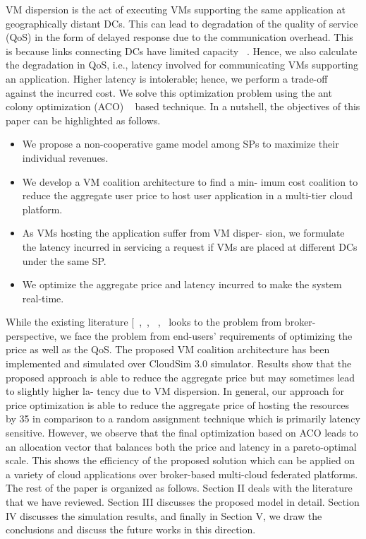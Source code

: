 \documentclass[12pt,a4paper,twoside,openright]{report}
\newcommand\tab[1][0.8cm]{\hspace*{#1}}
\begin{document}
\newline
\tab VM dispersion is the act of executing VMs supporting the
same application at geographically distant DCs. This can lead
to degradation of the quality of service (QoS) in the form of
delayed response due to the communication overhead. This
is because links connecting DCs have limited capacity ~\cite{b5}.
Hence, we also calculate the degradation in QoS, i.e., latency
involved for communicating VMs supporting an application.
Higher latency is intolerable; hence, we perform a trade-off
against the incurred cost. We solve this optimization problem
using the ant colony optimization (ACO) ~\cite{b6} based technique.
In a nutshell, the objectives of this paper can be highlighted
as follows.
\begin{itemize}
	\item We propose a non-cooperative game model among SPs
	to maximize their individual revenues.
	\item We develop a VM coalition architecture to find a min-
	imum cost coalition to reduce the aggregate user price
	to host user application in a multi-tier cloud platform.
	\item As VMs hosting the application suffer from VM disper-
	sion, we formulate the latency incurred in servicing a
	request if VMs are placed at different DCs under the
	same SP.
	\item We optimize the aggregate price and latency incurred to
	make the system real-time.
\end{itemize}
While the existing literature [~\cite{b1},~\cite{b2}, ~\cite{b3}, ~\cite{b4}looks to
the problem from broker-perspective, we face the problem
from end-users’ requirements of optimizing the price as well
as the QoS. The proposed VM coalition architecture has
been implemented and simulated over CloudSim 3.0 simulator.
Results show that the proposed approach is able to reduce the
aggregate price but may sometimes lead to slightly higher la-
tency due to VM dispersion. In general, our approach for price
optimization is able to reduce the aggregate price of hosting
the resources by 35%
in comparison to a random assignment technique which is
primarily latency sensitive. However, we observe that the final
optimization based on ACO leads to an allocation vector that
balances both the price and latency in a pareto-optimal scale.
This shows the efficiency of the proposed solution which can
be applied on a variety of cloud applications over broker-based
multi-cloud federated platforms.
\newline
\tab The rest of the paper is organized as follows. Section II deals with the literature that we have reviewed. Section III
discusses the proposed model in detail. Section IV discusses
the simulation results, and finally in Section V, we draw the
conclusions and discuss the future works in this direction.
\end{document}
